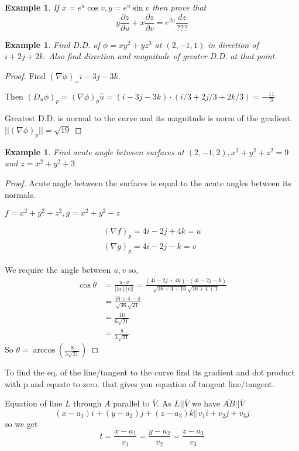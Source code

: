 \documentclass[oneside,11pt,pdftex]{book}%
\numberwithin{equation}{section}
\newtheorem{example}[theorem]{Example}
\numberwithin{section}{chapter}
\numberwithin{equation}{chapter}
\begin{document}
\begin{example}
	If $ x=e^u \cos v, y=e^u \sin v $ then prove that \[ y \frac{\partial z}{\partial u} + x \frac{\partial z}{\partial v}= e^{2u}\frac{dz}{???}\]
\end{example}
\begin{example}
	Find D.D. of $ \phi = xy^2+yz^3 $ at $ (2,-1,1) $ in direction of $ i+2j+2k $. Also find direction and magnitude of greater D.D. at that point.
\end{example}
\begin{proof}
	Find $ (\nabla \phi)_ =i-3j-3k$.
	
	Then $ (D_u \phi)_p=(\nabla \phi)_p \hat{u} = (i-3j-3k)\cdot (i/3+2j/3+2k/3)=-\frac{11}{3}$
	
	Greatest D.D. is normal to the curve and its magnitude is norm of the gradient.
	$ ||(\nabla \phi)_p||=\sqrt{19} $
\end{proof}
\begin{example}
	Find acute angle between surfaces at $ (2,-1,2), x^2+y^2+z^2=9 $ and $ z=x^2+y^2+3 $
\end{example}
\begin{proof}
	Acute angle between the surfaces is equal to the acute angles between its normals.
	
	$ f=x^2+y^2+z^2, g=x^2+y^2-z $
	
	\begin{align*}
		(\nabla f)_p=4i-2j+4k=u\\
		(\nabla g)_p=4i-2j-k=v
	\end{align*}

	We require the angle between $ u,v $ so,
	\begin{align*}
		\cos \theta &= \frac{u \cdot v}{||u|| ||v||}=\frac{(4i-2j+4k)\cdot(4i-2j-k)}{\sqrt{16+4+16}\sqrt{16+4+1}}\\
		&=\frac{16+4-4}{\sqrt{36}\sqrt{21}}\\
		&=\frac{16}{6 \sqrt{21}}\\
		&= \frac{8}{3 \sqrt{21}}
	\end{align*}
So $ \theta = \arccos \left(\frac{8}{3 \sqrt{21}}\right) $
\end{proof}

To find the eq. of the line/tangent to the curve find its gradient and dot product with p and equate to zero. that gives you equation of tangent line/tangent.


Equation of line $ L $ through $ A $ parallel to $ \overline{V} $.  As $ L || \overline{V} $ we have $ \overline{AB} || \overline{V} $ 
\[ (x-a_1)i+(y-a_2)j+(z-a_3)k || v_1i+v_2j+v_3j \]
so we get \[ t=\frac{x-a_1}{v_1}=\frac{y-a_2}{v_2}=\frac{z-a_3}{v_3} \]
\end{document}
